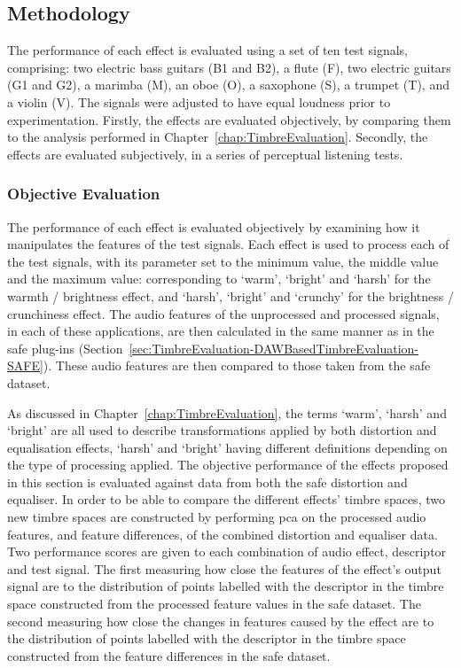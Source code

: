 	\subsection{Methodology}
	\label{sec:PerceptualExperiments-SemanticControl-Methodology}
		The performance of each effect is evaluated using a set of ten test signals, comprising: two electric bass
		guitars (B1 and B2), a flute (F), two electric guitars (G1 and G2), a marimba (M), an oboe (O), a saxophone
		(S), a trumpet (T), and a violin (V). The signals were adjusted to have equal loudness prior to
		experimentation.  Firstly, the effects are evaluated objectively, by comparing them to the analysis
		performed in Chapter~\ref{chap:TimbreEvaluation}. Secondly, the effects are evaluated subjectively, in a
		series of perceptual listening tests.

		\subsubsection*{Objective Evaluation}
			The performance of each effect is evaluated objectively by examining how it manipulates the
			features of the test signals. Each effect is used to process each of the test signals, with its
			parameter set to the minimum value, the middle value and the maximum value: corresponding to
			`warm', `bright' and `harsh' for the warmth / brightness effect, and `harsh', `bright' and
			`crunchy' for the brightness / crunchiness effect. The audio features of the unprocessed and
			processed signals, in each of these applications, are then calculated in the same manner as in the
			\acrshort{safe} plug-ins (Section~\ref{sec:TimbreEvaluation-DAWBasedTimbreEvaluation-SAFE}). These
			audio features are then compared to those taken from the \acrshort{safe} dataset.

			As discussed in Chapter~\ref{chap:TimbreEvaluation}, the terms `warm', `harsh' and `bright' are all
			used to describe transformations applied by both distortion and equalisation effects, `harsh' and
			`bright' having different definitions depending on the type of processing applied. The objective
			performance of the effects proposed in this section is evaluated against data from both the
			\acrshort{safe} distortion and equaliser. In order to be able to compare the different effects'
			timbre spaces, two new timbre spaces are constructed by performing \acrshort{pca} on the processed
			audio features, and feature differences, of the combined distortion and equaliser data. Two
			performance scores are given to each combination of audio effect, descriptor and test signal. The
			first measuring how close the features of the effect's output signal are to the distribution of
			points labelled with the descriptor in the timbre space constructed from the processed feature
			values in the \acrshort{safe} dataset. The second measuring how close the changes in features
			caused by the effect are to the distribution of points labelled with the descriptor in the timbre
			space constructed from the feature differences in the \acrshort{safe} dataset.

